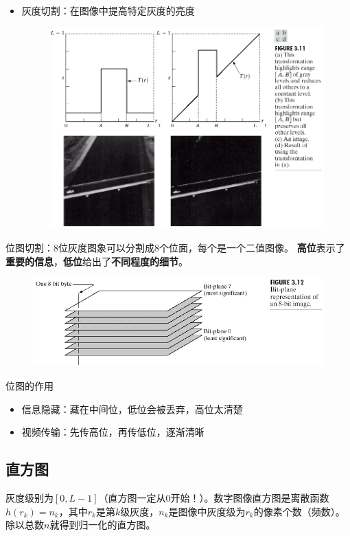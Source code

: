 \begin{itemize}
\begin{figure}[H]
\end{figure}
\item 灰度切割：在图像中提高特定灰度的亮度
\begin{figure}[H]
\centering
\includegraphics[width=0.6\linewidth]{fig/trans-cut.png}
\end{figure}
\end{itemize}

位图切割：8位灰度图象可以分割成8个位面，每个是一个二值图像。
\textbf{高位}表示了\textbf{重要的信息}，\textbf{低位}给出了\textbf{不同程度的细节}。
\begin{figure}[H]
\centering
\includegraphics[width=0.6\linewidth]{fig/bitmap.png}
\end{figure}

位图的作用
\begin{itemize}
	\item 信息隐藏：藏在中间位，低位会被丢弃，高位太清楚
	\item 视频传输：先传高位，再传低位，逐渐清晰
\end{itemize}

\subsection{直方图}
\begin{definition}[直方图]
灰度级别为$[0,L-1]$（直方图一定从0开始！）。数字图像直方图是离散函数$h(r_k)=n_k$，其中$r_k$是第$k$级灰度，$n_k$是图像中灰度级为$r_k$的像素个数（频数）。
除以总数$n$就得到归一化的直方图。
\end{definition}

